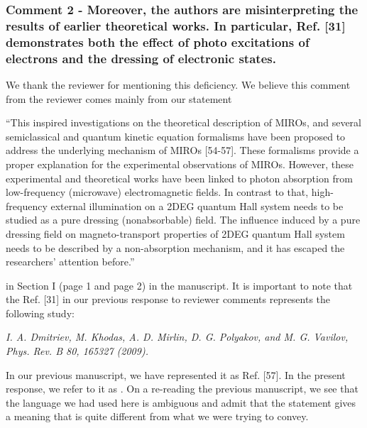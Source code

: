 \documentclass{article}
\begin{document}
\subsubsection*{Comment 2 -
\color{RoyalBlue} Moreover, the authors are misinterpreting the results of earlier theoretical works. In particular, Ref. [31] demonstrates both the effect of photo excitations of electrons and the dressing of electronic states.}

We thank the reviewer for mentioning this deficiency. We believe this comment from the reviewer comes mainly from our statement

{\color{CadetBlue} “This inspired investigations on the theoretical description of MIROs, and several semiclassical and quantum kinetic equation formalisms have been proposed to address the underlying mechanism of MIROs [54-57]. These formalisms provide a proper explanation for the experimental observations of MIROs. However, these experimental and theoretical works have been linked to photon absorption from low-frequency (microwave) electromagnetic fields.
In contrast to that, high-frequency external illumination on a 2DEG quantum Hall system needs to be studied as a pure dressing (nonabsorbable) field.
The influence induced by a pure dressing field on
magneto-transport properties of 2DEG quantum Hall system needs to be described by a non-absorption mechanism, and it has escaped the researchers’ attention before.”}

in Section I (page 1 and page 2) in the manuscript. It is important to note that the Ref. [31] in our previous response to reviewer comments represents the following study:

\textit{I. A. Dmitriev, M. Khodas, A. D. Mirlin, D. G. Polyakov, and M. G. Vavilov, Phys. Rev. B 80, 165327 (2009).}

In our previous manuscript, we have represented it as Ref. [57]. In the present response, we refer to it as \cite{dmitriev09}.
On a re-reading the previous manuscript, we see that the language we had used here is ambiguous and admit that the statement gives a meaning that is quite different from what we were trying to convey.
\end{document}
